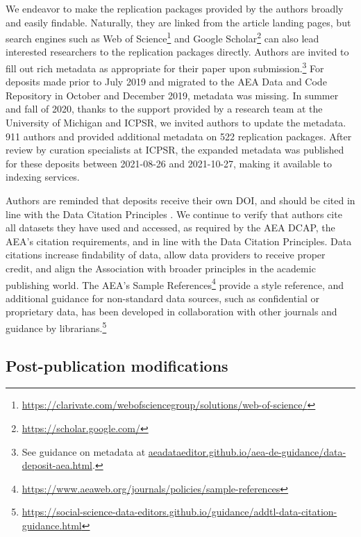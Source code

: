 \documentclass[PP]{AEA}
\newcommand{\urlcite}[2]{#2\footnote{\url{#1}}}
\newcommand{\purlcite}[2]{#2.\footnote{\url{#1}}}
\begin{document}
We endeavor to make the replication packages provided by the authors broadly and easily findable. Naturally, they are linked from the article landing pages, but search engines  such as \urlcite{https://clarivate.com/webofsciencegroup/solutions/web-of-science/}{Web of Science} and \urlcite{https://scholar.google.com/}{Google Scholar} can also lead interested researchers to the replication packages directly. Authors are invited to fill out rich metadata as appropriate for their paper upon submission.\footnote{See guidance on metadata at \href{https://aeadataeditor.github.io/aea-de-guidance/data-deposit-aea.html}{aeadataeditor.github.io/aea-de-guidance/data-deposit-aea.html}.} For deposits made prior to July 2019 and  migrated to the AEA Data and Code Repository in October and December 2019, metadata was missing. In summer and fall of 2020, thanks to the support provided by a research team at the University of Michigan and ICPSR, we invited authors to update the metadata. 911 authors and provided additional metadata on 522 replication packages. After review by curation specialists at ICPSR, the expanded metadata was published for these deposits between 2021-08-26 and 2021-10-27, making it available to indexing services. 

Authors are reminded that deposits receive their own \ac{DOI}, and should be cited in line with the Data Citation Principles \citep{Altman2013-fl,jddcp}. We continue to verify that authors cite all datasets they have used and accessed, as required by the AEA \ac{DCAP}, the AEA's citation requirements, and in line with the Data Citation Principles.  Data citations increase findability of data, allow data providers to receive proper credit, and align the Association with broader principles in the academic publishing world. The AEA's  \urlcite{https://www.aeaweb.org/journals/policies/sample-references}{Sample References} provide a style reference, and additional guidance for non-standard data sources, such as confidential or proprietary data, has been developed in collaboration with other journals and guidance by \purlcite{https://social-science-data-editors.github.io/guidance/addtl-data-citation-guidance.html}{librarians}


\subsection{Post-publication modifications}
\end{document}
